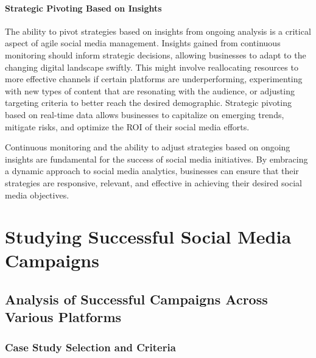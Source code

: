 \documentclass[
]{book}
\begin{document}
\hypertarget{strategic-pivoting-based-on-insights}{%
\subsubsection*{Strategic Pivoting Based on Insights}\label{strategic-pivoting-based-on-insights}}

The ability to pivot strategies based on insights from ongoing analysis is a critical aspect of agile social media management. Insights gained from continuous monitoring should inform strategic decisions, allowing businesses to adapt to the changing digital landscape swiftly. This might involve reallocating resources to more effective channels if certain platforms are underperforming, experimenting with new types of content that are resonating with the audience, or adjusting targeting criteria to better reach the desired demographic. Strategic pivoting based on real-time data allows businesses to capitalize on emerging trends, mitigate risks, and optimize the ROI of their social media efforts.

Continuous monitoring and the ability to adjust strategies based on ongoing insights are fundamental for the success of social media initiatives. By embracing a dynamic approach to social media analytics, businesses can ensure that their strategies are responsive, relevant, and effective in achieving their desired social media objectives.

\hypertarget{studying-successful-social-media-campaigns}{%
\chapter{Studying Successful Social Media Campaigns}\label{studying-successful-social-media-campaigns}}

\hypertarget{analysis-of-successful-campaigns-across-various-platforms}{%
\section*{Analysis of Successful Campaigns Across Various Platforms}\label{analysis-of-successful-campaigns-across-various-platforms}}

\hypertarget{case-study-selection-and-criteria}{%
\subsection*{Case Study Selection and Criteria}\label{case-study-selection-and-criteria}}
\end{document}
